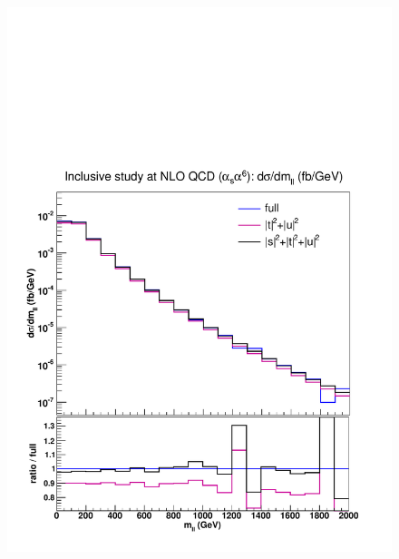 \begin{figure}[hbt]
\centering
{\includegraphics[scale=0.35]{figures/scanfigures/mll_nlo.pdf}}

\end{figure}

